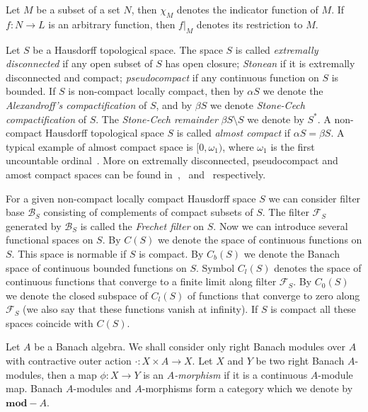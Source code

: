 \documentclass[12pt]{article}
\begin{document}
Let $M$ be a subset of a set $N$, then $\chi_M$ denotes the indicator function
of $M$. If $f:N\to L$ is an arbitrary function, then $f|_M$ denotes its
restriction to $M$.

Let $S$ be a Hausdorff topological space. The space $S$ is called
\textit{extremally disconnected} if any open subset of $S$ has open closure;
\textit{Stonean} if it is extremally disconnected and compact;
\textit{pseudocompact} if any continuous function on $S$ is bounded. If $S$ is
non-compact locally compact, then by $\alpha S$ we denote the
\textit{Alexandroff's compactification} of $S$, and by $\beta S$ we denote
\textit{Stone-Cech compactification} of $S$. The \textit{Stone-Cech remainder}
$\beta S\setminus S$ we denote by $S^*$. A non-compact Hausdorff topological
space $S$ is called \textit{almost compact} if $\alpha S=\beta S$. A typical
example of almost compact space is $[0, \omega_1)$, %
where $\omega_1$ is the first uncountable ordinal~\cite[paragraph
    1.3]{HrusPsdCompTopSp}. More on extremally disconnected, pseudocompact and amost
compact spaces can be found in~\cite[section 6.2]{EngkingGenTop},~\cite[section
    3.10]{EngkingGenTop} and~\cite[paragraph 1.3]{HrusPsdCompTopSp} respectively.

For a given non-compact locally compact Hausdorff space $S$ we can consider
filter base $\mathcal{B}_S$ consisting of complements of compact subsets of $S$.
The filter $\mathcal{F}_S$ generated by $\mathcal{B}_S$ is called the
\textit{Frechet filter} on $S$. Now we can introduce several functional spaces
on $S$. By $C(S)$ we denote the space of continuous functions on $S$. This space
is normable if $S$ is compact. By $C_b(S)$ we denote the Banach space of
continuous bounded functions on $S$. Symbol $C_l(S)$ denotes the space of
continuous functions that converge to a finite limit along filter
$\mathcal{F}_S$. By $C_0(S)$ we denote the closed subspace of $C_l(S)$ of
functions that converge to zero along $\mathcal{F}_S$ (we also say that these
functions vanish at infinity). If $S$ is compact all these spaces coincide with
$C(S)$.

Let $A$ be a Banach algebra. We shall consider only right Banach modules over
$A$ with contractive outer action $\cdot:X\times A\to X$. Let $X$ and $Y$ be two
right Banach $A$-modules, then a map $\phi:X\to Y$ is an \textit{$A$-morphism}
if it is a continuous $A$-module map. Banach $A$-modules and $A$-morphisms form
a category which we denote by $\mathbf{mod}-A$.
\end{document}
